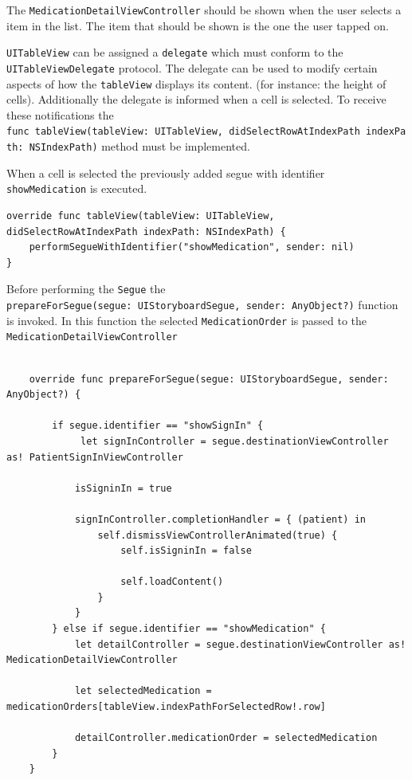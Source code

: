 \documentclass{article}
\begin{document}
The \texttt{MedicationDetailViewController} should be shown when the
user selects a item in the list. The item that should be shown is the
one the user tapped on.

\texttt{UITableView} can be assigned a \texttt{delegate} which must
conform to the \texttt{UITableViewDelegate} protocol. The delegate can
be used to modify certain aspects of how the \texttt{tableView} displays
its content. (for instance: the height of cells). Additionally the delegate is informed when a cell is selected. To receive these notifications the
\texttt{func\ tableView(tableView:\ UITableView,\ didSelectRowAtIndexPath\ indexPath:\ NSIndexPath)}
method must be implemented.

When a cell is selected the previously added segue with identifier
\texttt{showMedication} is executed.

\begin{verbatim}
override func tableView(tableView: UITableView, didSelectRowAtIndexPath indexPath: NSIndexPath) {
    performSegueWithIdentifier("showMedication", sender: nil)
}
\end{verbatim}

Before performing the \texttt{Segue} the \texttt{prepareForSegue(segue:\ UIStoryboardSegue,\ sender:\ AnyObject?)}
function is invoked. In this function the selected \texttt{MedicationOrder} is passed to the
\texttt{MedicationDetailViewController}

\begin{verbatim}

    override func prepareForSegue(segue: UIStoryboardSegue, sender: AnyObject?) {

        if segue.identifier == "showSignIn" {
             let signInController = segue.destinationViewController as! PatientSignInViewController

            isSigninIn = true

            signInController.completionHandler = { (patient) in
                self.dismissViewControllerAnimated(true) {
                    self.isSigninIn = false

                    self.loadContent()
                }
            }
        } else if segue.identifier == "showMedication" {
            let detailController = segue.destinationViewController as! MedicationDetailViewController

            let selectedMedication = medicationOrders[tableView.indexPathForSelectedRow!.row]

            detailController.medicationOrder = selectedMedication
        }
    }
\end{verbatim}
\end{document}
